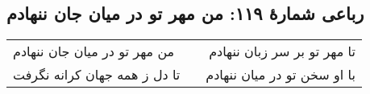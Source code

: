 \begin{center}
\section*{رباعی شمارهٔ ۱۱۹:  من مهر تو در میان جان ننهادم}
\label{sec:119}
\begin{longtable}{l p{0.5cm} r}
 من مهر تو در میان جان ننهادم
&&
تا مهر تو بر سر زبان ننهادم
\\
تا دل ز همه جهان کرانه نگرفت
&&
با او سخن تو در میان ننهادم 
\\
\end{longtable}
\end{center}
